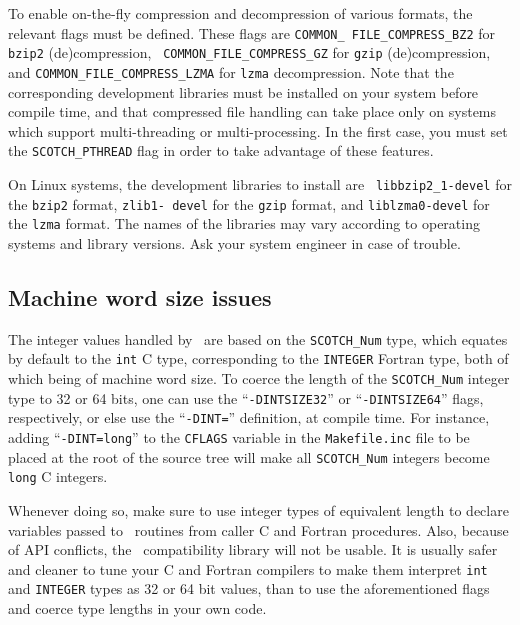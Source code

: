 To enable on-the-fly compression and decompression of various formats,
the relevant flags must be defined. These flags are {\tt COMMON\_\lbt
FILE\_\lbt COMPRESS\_\lbt BZ2} for {\tt bzip2} (de)compression, {\tt
COMMON\_\lbt FILE\_\lbt COMPRESS\_\lbt GZ} for {\tt gzip}
(de)compression, and {\tt COMMON\_\lbt FILE\_\lbt COMPRESS\_\lbt LZMA}
for {\tt lzma} decompression. Note that the corresponding
development libraries must be installed on your system before compile
time, and that compressed file handling can take place only on systems
which support multi-threading or multi-processing. In the first case,
you must set the {\tt SCOTCH\_\lbt PTHREAD} flag in order to take
advantage of these features.

On Linux systems, the development libraries to install are {\tt
libbzip2\_1-\lbt devel} for the {\tt bzip2} format, {\tt zlib1-\lbt
devel} for the {\tt gzip} format, and {\tt liblzma0-\lbt devel} for
the {\tt lzma} format. The names of the libraries may vary according
to operating systems and library versions. Ask your system engineer in
case of trouble.

\subsection{Machine word size issues}
\label{sec-install-inttypesize}

The integer values handled by \scotch\ are based on the
{\tt SCOTCH\_\lbt Num} type, which equates by default to the {\tt int}
C type, corresponding to the {\tt INTEGER} Fortran type, both of which
being of machine word size. To coerce the length of the
{\tt SCOTCH\_\lbt Num} integer type to 32 or 64 bits, one can use the
``{\tt -DINTSIZE32}'' or ``{\tt -DINTSIZE64}'' flags, respectively, or
else use the ``{\tt -DINT=}'' definition, at compile time. For
instance, adding ``{\tt -DINT=long}'' to the {\tt CFLAGS} variable in
the {\tt Makefile.inc} file to be placed at the root of the source
tree will make all {\tt SCOTCH\_\lbt Num} integers become {\tt long} C
integers.

Whenever doing so, make sure to use integer types of equivalent length
to declare variables passed to \scotch\ routines from caller C and
Fortran procedures. Also, because of API conflicts, the
\metis\ compatibility library will not be usable. It is usually safer
and cleaner to tune your C and Fortran compilers to make them
interpret {\tt int} and {\tt INTEGER} types as 32 or 64 bit values,
than to use the aforementioned flags and coerce type lengths in your
own code.

